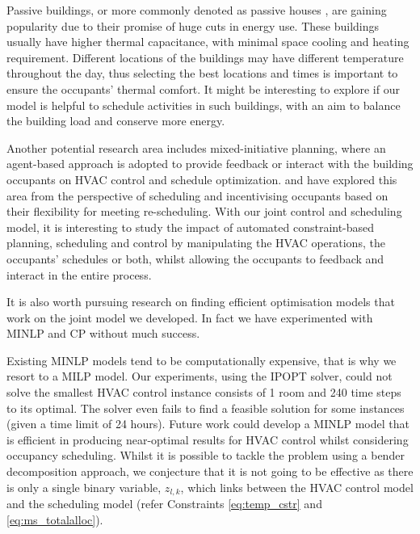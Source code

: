 Passive buildings, or more commonly denoted as passive houses \citep{henze2004evaluation,sadineni2011passive}, are gaining popularity due to their promise of huge cuts in energy use. These buildings usually have higher thermal capacitance, with minimal space cooling and heating requirement. Different locations of the buildings may have different temperature throughout the day, thus selecting the best locations and times is important to ensure the occupants' thermal comfort. It might be interesting to explore if our model is helpful to schedule activities in such buildings, with an aim to balance the building load and conserve more energy. 

Another potential research area includes mixed-initiative planning, where an agent-based approach is adopted to provide feedback or interact with the building occupants on HVAC control and schedule optimization. \cite{klein2012coordinating} and \cite{kwak2014building} have explored this area from the perspective of scheduling and incentivising occupants based on their flexibility for meeting re-scheduling. With our joint control and scheduling model, it is interesting to study the impact of automated constraint-based planning, scheduling and control by manipulating the HVAC operations, the occupants' schedules or both, whilst allowing the occupants to feedback and interact in the entire process.

It is also worth pursuing research on finding efficient optimisation models that work on the joint model we developed. In fact we have experimented with MINLP and CP without much success. 

Existing MINLP models tend to be computationally expensive, that is why we resort to a MILP model. Our experiments, using the IPOPT solver, could not solve the smallest HVAC control instance consists of 1 room and 240 time steps to its optimal. The solver even fails to find a feasible solution for some instances (given a time limit of 24 hours).
Future work could develop a MINLP model that is efficient in producing near-optimal results for HVAC control whilst considering occupancy scheduling. Whilst it is possible to tackle the problem using a bender decomposition approach, we conjecture that it is not going to be effective as there is only a single binary variable, $z_{l,k}$, which links between the HVAC control model and the scheduling model (refer Constraints \eqref{eq:temp_cstr} and \eqref{eq:ms_totalalloc}).

